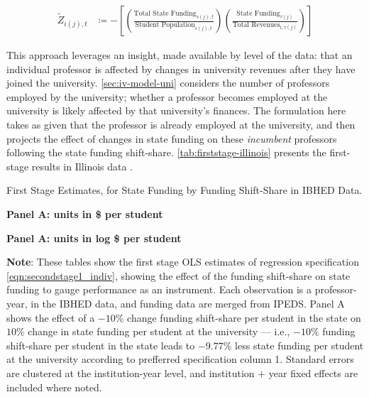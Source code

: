 \begin{align}
    \label{eqn:rolling-instrument}
    \tilde Z_{i(j),t} &\coloneqq - \left[
    \left( \frac{\text{Total State Funding}_{s(j),t}}{\text{Student Population}_{s(j),t}} \right)
    \left( \frac{\text{State Funding}_{\tau(j)}}{\text{Total Revenues}_{i,\tau(j)}} \right) \right]
\end{align}

This approach leverages an insight, made available by level of the data: that an individual professor is affected by changes in university revenues after they have joined the university.
\autoref{sec:iv-model-uni} considers the number of professors employed by the university; whether a professor becomes employed at the university is likely affected by that university's finances.
The formulation here takes as given that the professor is already employed at the university, and then projects the effect of changes in state funding on these \textit{incumbent} professors following the state funding shift-share.
\autoref{tab:firststage-illinois} presents the first-stage results in Illinois data .

\begin{table}[h!]
    \singlespacing
    \centering
    \caption{First Stage Estimates, for State Funding by Funding Shift-Share in IBHED Data.}
    \textbf{Panel A: units in \$ per student}
    
    \makebox[\textwidth][c]{}
    
    \textbf{Panel A: units in log \$ per student}
    
    \makebox[\textwidth][c]{}
    
    \label{tab:firststage-illinois}
    \justify
    \footnotesize
    \textbf{Note}:
    These tables show the first stage OLS estimates of regression specification \eqref{eqn:secondstage1_indiv}, showing the effect of the funding shift-share on state funding to gauge performance as an instrument.
    Each observation is a professor-year, in the IBHED data, and funding data are merged from IPEDS.
    Panel A shows the effect of a $-10$\% change funding shift-share per student in the state on $10$\% change in state funding per student at the university --- i.e.,
    $-10$\% funding shift-share per student in the state leads to $-9.77$\% less state funding per student at the university according to prefferred specification column 1.        
    Standard errors are clustered at the institution-year level, and institution $+$ year fixed effects are included where noted.
\end{table}


